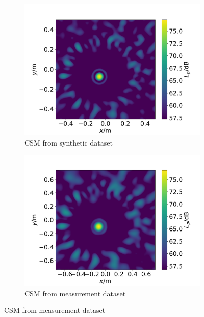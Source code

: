\documentclass[11pt,a4paper,twoside]{report}
\begin{document}
\begin{figure}
    \centering
    \begin{subfigure}{0.45\textwidth}
        \centering
        \includegraphics[width=1.3\textwidth]{figs/datasets_beamforming_example_synthetic.pdf}
        \caption{CSM from synthetic dataset}
        \label{fig:data_augmentation_evals_synthetic}
    \end{subfigure}
    \hfill
    \begin{subfigure}{0.45\textwidth}
        \centering
        \includegraphics[width=1.3\textwidth]{figs/datasets_beamforming_example_measurement.pdf}
        \caption{CSM from measurement dataset}
        \label{fig:data_augmentation_evals_measurement}
    \end{subfigure}

\end{figure}
\end{document}
